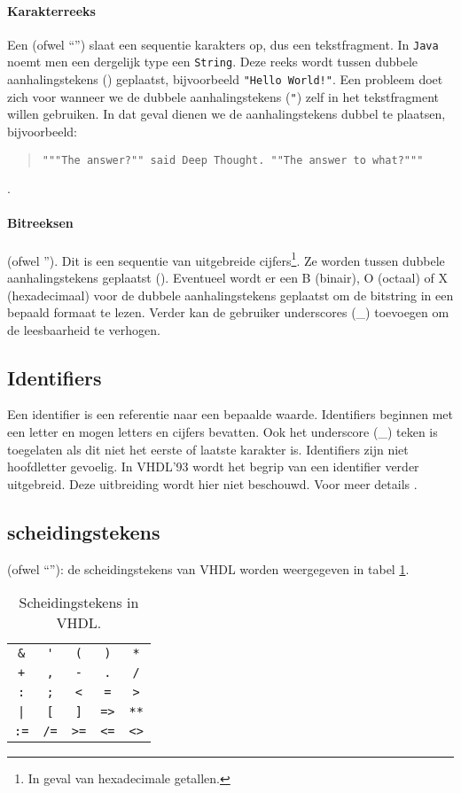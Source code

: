 \paragraph{Karakterreeks}
Een  (ofwel ``'') slaat een sequentie karakters op, dus een tekstfragment. In \texttt{Java} noemt men een dergelijk type een \texttt{String}. Deze reeks wordt tussen dubbele aanhalingstekens () geplaatst, bijvoorbeeld \texttt{"Hello World!"}. Een probleem doet zich voor wanneer we de dubbele aanhalingstekens (\texttt{"}) zelf in het tekstfragment willen gebruiken. In dat geval dienen we de aanhalingstekens dubbel te plaatsen, bijvoorbeeld:
\begin{quote}\verb+"""The answer?"" said Deep Thought. ""The answer to what?"""+\cite[\S25]{Adams81BOOK54}\end{quote}.
\paragraph{Bitreeksen}
 (ofwel ''). Dit is een sequentie van uitgebreide cijfers\footnote{In geval van hexadecimale getallen.}. Ze worden tussen dubbele aanhalingstekens geplaatst (). Eventueel wordt er een B (binair), O (octaal) of X (hexadecimaal) voor de dubbele aanhalingstekens geplaatst om de bitstring in een bepaald formaat te lezen. Verder kan de gebruiker underscores (\_) toevoegen om de leesbaarheid te verhogen.
\subsection{Identifiers}
Een identifier is een referentie naar een bepaalde waarde. Identifiers beginnen met een letter en mogen letters en cijfers bevatten. Ook het underscore (\_) teken is toegelaten als dit niet het eerste of laatste karakter is. Identifiers zijn niet hoofdletter gevoelig. In VHDL'93 wordt het begrip van een identifier verder uitgebreid. Deze uitbreiding wordt hier niet beschouwd. Voor meer details \cite[p. 4]{hardi00}.
\subsection{scheidingstekens}
 (ofwel ``''): de
scheidingstekens van VHDL worden weergegeven in tabel \ref{tbl:vHDLdelimiters}.
\begin{table}[hbt]
\centering
\begin{tabular}{ccccc}
\verb+&+&\verb+'+&\verb+(+&\verb+)+&\verb+*+\\
\verb/+/&\verb+,+&\verb+-+&\verb+.+&\verb+/+\\
\verb+:+&\verb+;+&\verb+<+&\verb+=+&\verb+>+\\
\verb+|+&\verb+[+&\verb+]+&\verb+=>+&\verb+**+\\
\verb+:=+&\verb+/=+&\verb+>=+&\verb+<=+&\verb+<>+
\end{tabular}
\caption{Scheidingstekens in VHDL.}
\label{tbl:vHDLdelimiters}
\end{table}
